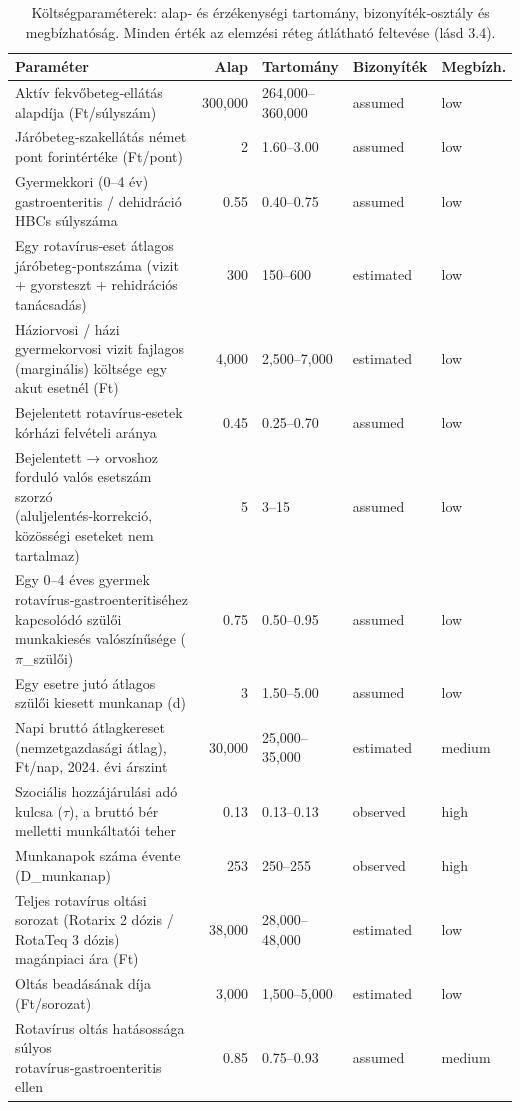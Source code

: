 \begin{table}[htbp]
\centering
\small
\caption{Költségparaméterek: alap‑ és érzékenységi tartomány, bizonyíték‑osztály és megbízhatóság. Minden érték az elemzési réteg átlátható feltevése (lásd 3.4).}
\label{tab:cost}
\begin{tabular}{p{5.4cm}rp{2.9cm}ll}
\toprule
Paraméter & Alap & Tartomány & Bizonyíték & Megbízh. \\
\midrule
Aktív fekvőbeteg‑ellátás alapdíja (Ft/súlyszám) & 300,000 & 264,000--360,000 & assumed & low \\
Járóbeteg‑szakellátás német pont forintértéke (Ft/pont) & 2 & 1.60--3.00 & assumed & low \\
Gyermekkori (0--4 év) gastroenteritis / dehidráció HBCs súlyszáma & 0.55 & 0.40--0.75 & assumed & low \\
Egy rotavírus‑eset átlagos járóbeteg‑pontszáma (vizit + gyorsteszt + rehidrációs tanácsadás) & 300 & 150--600 & estimated & low \\
Háziorvosi / házi gyermekorvosi vizit fajlagos (marginális) költsége egy akut esetnél (Ft) & 4,000 & 2,500--7,000 & estimated & low \\
Bejelentett rotavírus‑esetek kórházi felvételi aránya & 0.45 & 0.25--0.70 & assumed & low \\
Bejelentett → orvoshoz forduló valós esetszám szorzó (aluljelentés‑korrekció, közösségi eseteket nem tartalmaz) & 5 & 3--15 & assumed & low \\
Egy 0--4 éves gyermek rotavírus‑gastroenteritiséhez kapcsolódó szülői munkakiesés valószínűsége ($\pi$\_szülői) & 0.75 & 0.50--0.95 & assumed & low \\
Egy esetre jutó átlagos szülői kiesett munkanap (d) & 3 & 1.50--5.00 & assumed & low \\
Napi bruttó átlagkereset (nemzetgazdasági átlag), Ft/nap, 2024. évi árszint & 30,000 & 25,000--35,000 & estimated & medium \\
Szociális hozzájárulási adó kulcsa ($\tau$), a bruttó bér melletti munkáltatói teher & 0.13 & 0.13--0.13 & observed & high \\
Munkanapok száma évente (D\_munkanap) & 253 & 250--255 & observed & high \\
Teljes rotavírus oltási sorozat (Rotarix 2 dózis / RotaTeq 3 dózis) magánpiaci ára (Ft) & 38,000 & 28,000--48,000 & estimated & low \\
Oltás beadásának díja (Ft/sorozat) & 3,000 & 1,500--5,000 & estimated & low \\
Rotavírus oltás hatásossága súlyos rotavírus‑gastroenteritis ellen & 0.85 & 0.75--0.93 & assumed & medium \\
\bottomrule
\end{tabular}
\end{table}
